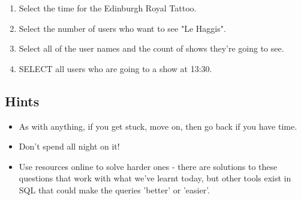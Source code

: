 \documentclass[11pt]{article}
\begin{document}
\begin{enumerate}
\item Select the time for the Edinburgh Royal Tattoo.

\item Select the number of users who want to see "Le Haggis".

\item Select all of the user names and the count of shows they're going to
see.

\item SELECT all users who are going to a show at 13:30.
\end{enumerate}

\subsection{Hints}
\label{sec-2-4}

\begin{itemize}
\item As with anything, if you get stuck, move on, then go back if you have
time.
\item Don't spend all night on it!
\item Use resources online to solve harder ones - there are solutions to
these questions that work with what we've learnt today, but other
tools exist in SQL that could make the queries 'better' or 'easier'.
\end{itemize}
\end{document}
